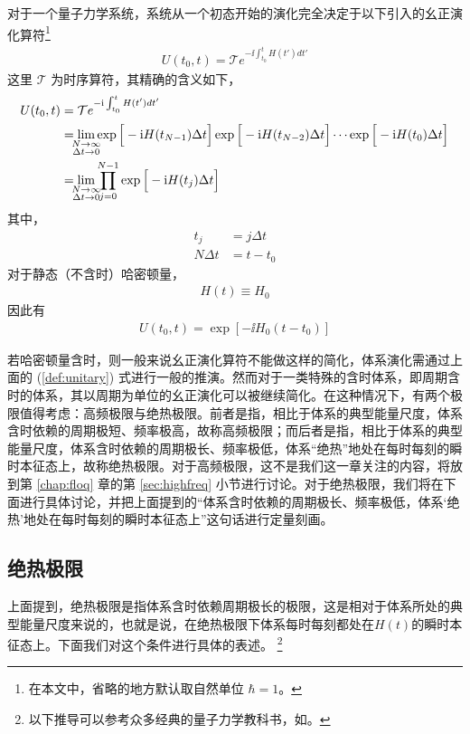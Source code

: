 对于一个量子力学系统，系统从一个初态开始的演化完全决定于以下引入的幺正演化算符\footnote{在本文中，省略的地方默认取自然单位 $\hbar=1$。}
\begin{align}
U(t_0,t)=\mathcal{T}e^{-\ii\int_{t_0}^t H(t')dt'}
\end{align}
这里 $\mathcal{T}$ 为时序算符，其精确的含义如下，
\begin{align}\label{def:unitary}
U(t_0, t)&=\mathcal{T}e^{-\ii\int_{t_0}^{t} H(t')dt'}\\
&= \lim_{\mathclap{\substack{N\rightarrow\infty\\\Delta t\rightarrow0}}}\exp\Big[-\ii H(t_{N-1})\Delta t\Big]\exp\Big[-\ii H(t_{N-2})\Delta t\Big]\cdots\exp\Big[-\ii H(t_0)\Delta t\Big]\\
&= \lim_{\mathclap{\substack{N\rightarrow\infty\\\Delta t\rightarrow0}}}\prod_{j=0}^{N-1}\exp\Big[-\ii H(t_j)\Delta t\Big]
\end{align}
其中，
\begin{align}
t_{j} &= j\Delta t \\
N\Delta t &= t-t_0
\end{align}
对于静态（不含时）哈密顿量，
\begin{align}
H(t)\equiv H_0
\end{align}
因此有
\begin{align*}
U(t_0,t)=\exp[-\ii H_0(t-t_0)]
\end{align*}

若哈密顿量含时，则一般来说幺正演化算符不能做这样的简化，体系演化需通过上面的 (\ref{def:unitary}) 式进行一般的推演。然而对于一类特殊的含时体系，即周期含时的体系，其以周期为单位的幺正演化可以被继续简化。在这种情况下，有两个极限值得考虑：高频极限与绝热极限。前者是指，相比于体系的典型能量尺度，体系含时依赖的周期极短、频率极高，故称高频极限；而后者是指，相比于体系的典型能量尺度，体系含时依赖的周期极长、频率极低，体系“绝热”地处在每时每刻的瞬时本征态上，故称绝热极限。对于高频极限，这不是我们这一章关注的内容，将放到第 \ref{chap:floq} 章的第 \ref{sec:highfreq} 小节进行讨论。对于绝热极限，我们将在下面进行具体讨论，并把上面提到的“体系含时依赖的周期极长、频率极低，体系‘绝热’地处在每时每刻的瞬时本征态上”这句话进行定量刻画。

\subsection{绝热极限}\label{sec:adiabatic}
上面提到，绝热极限是指体系含时依赖周期极长的极限，这是相对于体系所处的典型能量尺度来说的，也就是说，在绝热极限下体系每时每刻都处在$H(t)$的瞬时本征态上。下面我们对这个条件进行具体的表述。
\footnote{以下推导可以参考众多经典的量子力学教科书，如。}

